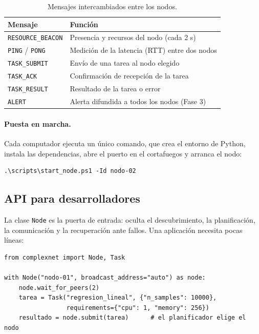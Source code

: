 \documentclass{article}
\begin{document}
\begin{table}[htbp]
\centering
\small
\begin{tabular}{|l|p{}|}
\hline
\textbf{Mensaje} & \textbf{Función} \\ \hline
\texttt{RESOURCE\_BEACON} & Presencia y recursos del nodo (cada 2 s) \\ \hline
\texttt{PING} / \texttt{PONG} & Medición de la latencia (RTT) entre dos nodos \\ \hline
\texttt{TASK\_SUBMIT} & Envío de una tarea al nodo elegido \\ \hline
\texttt{TASK\_ACK} & Confirmación de recepción de la tarea \\ \hline
\texttt{TASK\_RESULT} & Resultado de la tarea o error \\ \hline
\texttt{ALERT} & Alerta difundida a todos los nodos (Fase 3) \\ \hline
\end{tabular}
\caption{Mensajes intercambiados entre los nodos.}
\label{tab:mensajes}
\end{table}

\paragraph{Puesta en marcha.}
Cada computador ejecuta un único comando, que crea el entorno de Python, instala las dependencias,
abre el puerto en el cortafuegos y arranca el nodo:

\begin{verbatim}
.\scripts\start_node.ps1 -Id nodo-02
\end{verbatim}

\subsection{API para desarrolladores}

La clase \texttt{Node} es la puerta de entrada: oculta el descubrimiento, la planificación, la
comunicación y la recuperación ante fallos. Una aplicación necesita pocas líneas:

\begin{verbatim}
from complexnet import Node, Task

with Node("nodo-01", broadcast_address="auto") as node:
    node.wait_for_peers(2)
    tarea = Task("regresion_lineal", {"n_samples": 10000},
                 requirements={"cpu": 1, "memory": 256})
    resultado = node.submit(tarea)      # el planificador elige el nodo
\end{verbatim}
\end{document}

